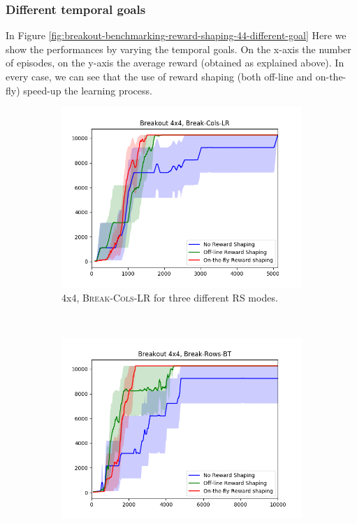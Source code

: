 \subsubsection{Different temporal goals}
In Figure \ref{fig:breakout-benchmarking-reward-shaping-44-different-goal} Here we show the performances by varying the temporal goals.
On the x-axis the number of episodes, on the y-axis the average reward (obtained as explained above). In every case, we can see that the use of reward shaping (both off-line and on-the-fly) speed-up the learning process.
\begin{figure}[h]
	\centering
	\begin{subfigure}[b]{0.57\textwidth}
		\includegraphics[width=\textwidth]{images/b44-cols-comparison}
	 	\caption{\Breakout 4x4, \textsc{Break-Cols-LR} for three different RS modes.}
		\label{fig:breakout-benchmarking-reward-shaping-44-lr-varying-goal}
	\end{subfigure}
	~ %
	\begin{subfigure}[b]{0.57\textwidth}
		\includegraphics[width=\textwidth]{images/b44-rows-comparison}

\end{subfigure}
\end{figure}
